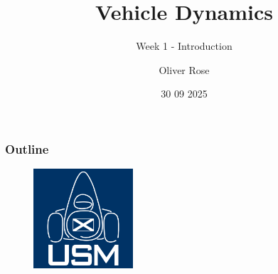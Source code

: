 \documentclass{beamer}
\title{Vehicle Dynamics}
\subtitle{Week 1 - Introduction}
\author{Oliver Rose}
\institute{University of Strathclyde Motorsport}
\date{30 09 2025}
\begin{document}
\begin{frame}
    \maketitle
\end{frame}

\begin{frame}
\frametitle{Outline}
\tableofcontents
\end{frame}





\begin{frame}[focus]
    \begin{figure}
        \includegraphics[width=0.33\textwidth]{../../res/usm-logo.png}
    \end{figure}
\end{frame}
\end{document}
